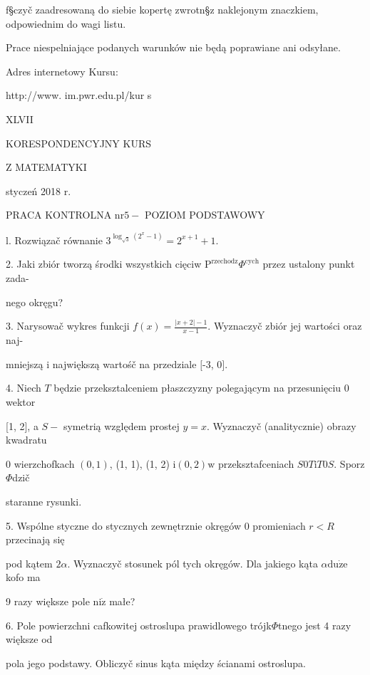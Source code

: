 \documentclass[a4paper,12pt]{article}
\begin{document}
f\S czyč zaadresowaną do siebie kopertę zwrotn\S z naklejonym znaczkiem, odpowiednim do wagi listu.

Prace niespelniające podanych warunków nie będą poprawiane ani odsyłane.

Adres internetowy Kursu:

http://www. im.pwr.edu.pl/kur s







XLVII

KORESPONDENCYJNY KURS

Z MATEMATYKI

styczeń 2018 r.

PRACA KONTROLNA $\mathrm{n}\mathrm{r} 5-$ POZIOM PODSTAWOWY

l. Rozwiązač równanie $3^{\log_{\sqrt{3}}(2^{x}-1)}=2^{x+1}+1.$

2. Jaki zbiór tworzą środki wszystkich cięciw $\mathrm{P}^{\mathrm{r}\mathrm{z}\mathrm{e}\mathrm{c}\mathrm{h}\mathrm{o}\mathrm{d}\mathrm{z}}\Phi^{\mathrm{c}\mathrm{y}\mathrm{c}\mathrm{h}}$ przez ustalony punkt zada-

nego okręgu?

3. Narysowač wykres funkcji $f(x) = \displaystyle \frac{|x+2|-1}{x-1}$. Wyznaczyč zbiór jej wartości oraz naj-

mniejszą $\mathrm{i}$ największą wartośč na przedziale $[$-3, $0].$

4. Niech $T$ będzie przeksztalceniem płaszczyzny polegającym na przesunięciu $0$ wektor

[1, 2], a $S-$ symetrią względem prostej $y=x$. Wyznaczyč (analitycznie) obrazy kwadratu

$0$ wierzchofkach $(0,1)$, (1, 1), (1, 2) $\mathrm{i}(0,2)\mathrm{w}$ przeksztafceniach $S0T\mathrm{i}T0S$. Sporz$\Phi$dzič

staranne rysunki.

5. Wspólne styczne do stycznych zewnętrznie okręgów $0$ promieniach $r<R$ przecinają się

pod kątem $ 2\alpha$. Wyznaczyč stosunek pól tych okręgów. Dla jakiego kąta $\alpha \mathrm{d}\mathrm{u}\dot{\mathrm{z}}\mathrm{e}$ kofo ma

9 razy większe pole $\mathrm{n}\mathrm{i}\dot{\mathrm{z}}$ małe?

6. Pole powierzchni cafkowitej ostroslupa prawidlowego trójk$\Phi$tnego jest 4 razy większe od

pola jego podstawy. Obliczyč sinus kąta między ścianami ostroslupa.
\end{document}
